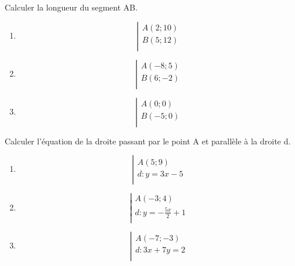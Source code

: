 \begin{exercice}
Calculer la longueur du segment AB.
\begin{multicols}{3}
\begin{enumerate}
\item $$\left| \begin{array}{l}
 A\left( 2;10 \right) \\ 
B\left( 5;12 \right) \\ 
\end{array} \right.$$
\item $$\left| \begin{array}{l}
 A\left( -8;5 \right) \\ 
B\left( 6;-2 \right) \\ 
\end{array} \right.$$
\item $$\left| \begin{array}{l}
 A\left( 0;0 \right) \\ 
B\left( -5;0 \right) \\ 
\end{array} \right.$$
\end{enumerate}
\end{multicols}
\end{exercice}

\begin{exercice}
Calculer l'équation de la droite passant par le point A et parallèle à la droite d.
\begin{multicols}{3}
\begin{enumerate}
\item $$\left| \begin{array}{l}
 A\left( 5;9 \right) \\ 
d:y=3x-5 \\ 
\end{array} \right.$$
\item $$\left| \begin{array}{l}
 A\left( -3;4 \right) \\ 
d:y=-\frac{5x}{2}+1 \\ 
\end{array} \right.$$
\item $$\left| \begin{array}{l}
 A\left( -7;-3 \right) \\ 
d:3x+7y=2 \\ 
\end{array} \right.$$
\end{enumerate}
\end{multicols}
\end{exercice}

